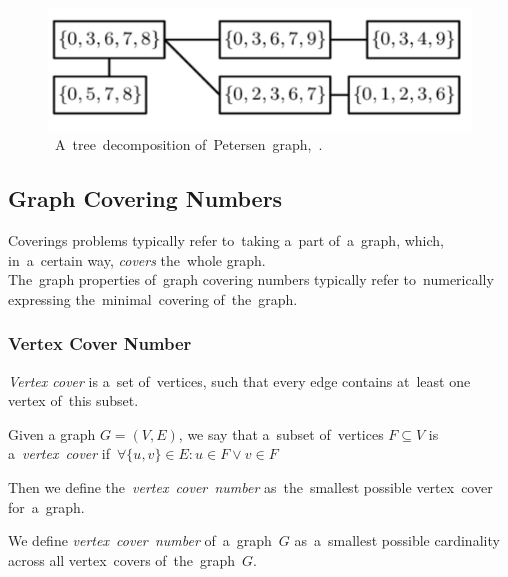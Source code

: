 \begin{figure}[h]
\centering
{}  


    \includegraphics[width=0.5\linewidth]{petersen_tree_decomposition.png}
    \caption[A~tree~decomposition of~Petersen~graph]{~A~tree~decomposition of~Petersen~graph,~\cite{Huszár}.}
    \label{fig:td_petersen_2}
\end{figure}
\subsection{Graph Covering Numbers}
Coverings problems typically refer to~taking a~part of~a~graph, which, in~a~certain way, \textit{covers} the~whole graph. \\
The~graph properties of~graph covering numbers typically refer to~numerically expressing the~minimal~covering of~the~graph.
\subsubsection{Vertex Cover Number}
\label{subsubsec:VCN}
\textit{Vertex cover} is a~set of~vertices, such that every edge contains at~least one vertex of~this subset.
\begin{definition}
    Given a graph $G = (V, E)$, we say that a~subset of~vertices ${F \subseteq V}$ is a~\emph{vertex~cover} if ${\,\forall \{u, v\} \in E: u \in F \lor v \in F}$
\end{definition}
Then we define the~\textit{vertex~cover~number} as~the~smallest possible vertex~cover for~a~graph.
\begin{definition}
    We define \emph{vertex~cover~number} of~a~graph~$G$ as~a~smallest possible cardinality across all vertex~covers of~the~graph~$G$.
\end{definition}

